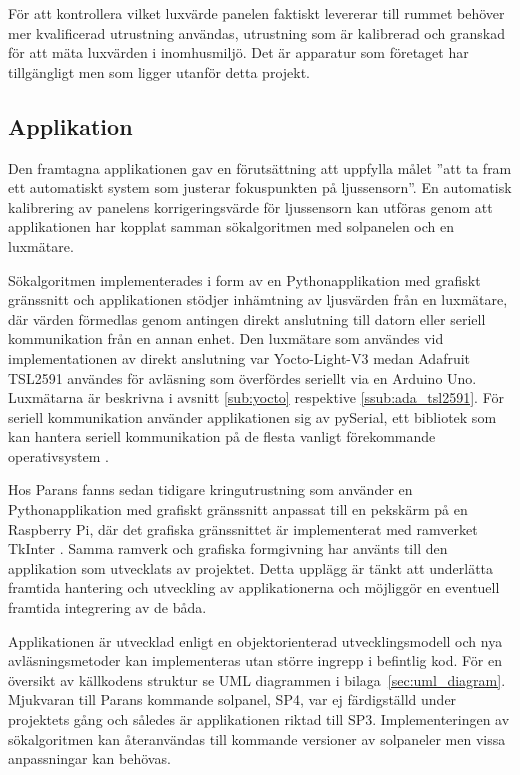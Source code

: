             För att kontrollera vilket luxvärde panelen faktiskt levererar till rummet behöver mer kvalificerad utrustning användas, utrustning som är kalibrerad och granskad för att mäta luxvärden i inomhusmiljö. Det är apparatur som företaget har tillgängligt men som ligger utanför detta projekt.

    \subsection{Applikation} %
    \label{sub:applikation}
        Den framtagna applikationen gav en förutsättning att uppfylla målet ''att ta fram ett automatiskt system som justerar fokuspunkten på ljussensorn''. En automatisk kalibrering av panelens korrigeringsvärde för ljussensorn kan utföras genom att applikationen har kopplat samman sökalgoritmen med solpanelen och en luxmätare.\bigskip

        Sökalgoritmen implementerades i form av en Pythonapplikation med grafiskt gränssnitt och applikationen stödjer inhämtning av ljusvärden från en luxmätare, där värden förmedlas genom antingen direkt anslutning till datorn eller seriell kommunikation från en annan enhet. Den luxmätare som användes vid implementationen av direkt anslutning var Yocto-Light-V3 medan Adafruit TSL2591 användes för avläsning som överfördes seriellt via en Arduino Uno. Luxmätarna är beskrivna i avsnitt \ref{sub:yocto} respektive \ref{ssub:ada_tsl2591}. För seriell kommunikation använder applikationen sig av pySerial, ett bibliotek som kan hantera seriell kommunikation på de flesta vanligt förekommande operativsystem \cite{pyserial}. \bigskip

        Hos Parans fanns sedan tidigare kringutrustning som använder en Pythonapplikation med grafiskt gränssnitt anpassat till en pekskärm på en Raspberry Pi, där det grafiska gränssnittet är implementerat med ramverket TkInter \cite{solarremote}. Samma ramverk och grafiska formgivning har använts till den applikation som utvecklats av projektet. Detta upplägg är tänkt att underlätta framtida hantering och utveckling av applikationerna och möjliggör en eventuell framtida integrering av de båda. \bigskip

        Applikationen är utvecklad enligt en objektorienterad utvecklingsmodell och nya avläsningsmetoder kan implementeras utan större ingrepp i befintlig kod. För en översikt av källkodens struktur se UML diagrammen i bilaga~\ref{sec:uml_diagram}. Mjukvaran till Parans kommande solpanel, SP4, var ej färdigställd under projektets gång och således är applikationen riktad till SP3. Implementeringen av sökalgoritmen kan återanvändas till kommande versioner av solpaneler men vissa anpassningar kan behövas.
